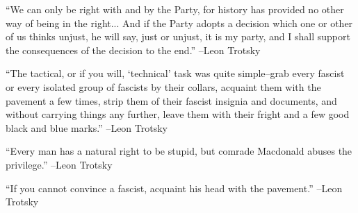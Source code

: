 \documentclass{article}%
\begin{document}
\linebreak%
\vspace{1mm}%
\begin{minipage}{\textwidth}%
\flushleft%
“We can only be right with and by the Party, for history has provided no other way of being in the right... And if the Party adopts a decision which one or other of us thinks unjust, he will say, just or unjust, it is my party, and I shall support the consequences of the decision to the end.”%
\linebreak%
\vspace{1mm}%
–Leon Trotsky%
\linebreak%
\vspace{1mm}%
\end{minipage}%
\linebreak%
\vspace{1mm}%
\begin{minipage}{\textwidth}%
\flushleft%
“The tactical, or if you will, ‘technical’ task was quite simple–grab every fascist or every isolated group of fascists by their collars, acquaint them with the pavement a few times, strip them of their fascist insignia and documents, and without carrying things any further, leave them with their fright and a few good black and blue marks.”%
\linebreak%
\vspace{1mm}%
–Leon Trotsky%
\linebreak%
\vspace{1mm}%
\end{minipage}%
\linebreak%
\vspace{1mm}%
\begin{minipage}{\textwidth}%
\flushleft%
“Every man has a natural right to be stupid, but comrade Macdonald abuses the privilege.”%
\linebreak%
\vspace{1mm}%
–Leon Trotsky%
\linebreak%
\vspace{1mm}%
\end{minipage}%
\linebreak%
\vspace{1mm}%
\begin{minipage}{\textwidth}%
\flushleft%
“If you cannot convince a fascist, acquaint his head with the pavement.”%
\linebreak%
\vspace{1mm}%
–Leon Trotsky%
\linebreak%
\vspace{1mm}%
\end{minipage}%
\end{document}
